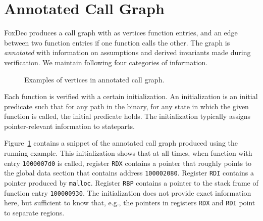 \documentclass[12pt,a4paper]{article}
\newcounter{example}
\begin{document}
	

\newpage

\section{Annotated Call Graph}\label{sec:callgraph}



FoxDec produces a call graph with as vertices function entries, and an edge between two function entries if one function calls the other.
The graph is \emph{annotated} with information on assumptions and derived invariants made during verification.
We maintain following four categories of information.

\begin{figure}[htb]
\centering
\caption{Examples of vertices in annotated call graph.}
\label{fig:callgraph1}
\end{figure}


\begin{description}[style=unboxed,leftmargin=0cm,noitemsep,nosep]
\item[INITIAL.] Each function is verified with a certain initialization.
An initialization is an initial predicate such that for any path in the binary, for any state in which the given function is called, the initial predicate holds.
The initialization typically assigns pointer-relevant information to stateparts.
\end{description}
\begin{example}[INITIAL]
Figure~\ref{fig:callgraph1} contains a snippet of the annotated call graph produced using the running example.
This initialization shows that at all times, when function with entry \texttt{1000007d0} is called, register \texttt{RDX} contains a pointer that roughly points to the global data section that contains address \texttt{100002080}. Register \texttt{RDI} contains a pointer produced by \texttt{malloc}. Register \texttt{RBP} contains a pointer to the stack frame of function entry \texttt{100000930}. The initialization does not provide exact information here, but sufficient to know that, e.g., the pointers in registers \texttt{RDX} and \texttt{RDI} point to separate regions.
\end{example}
\end{document}
